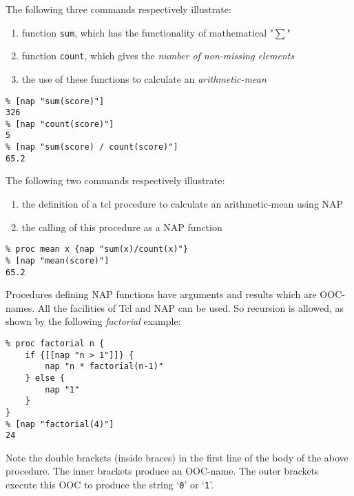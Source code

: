 The following three commands respectively illustrate:
    \begin{enumerate}
      \item function 
      \texttt{sum}, which has the functionality of mathematical
      "$\sum$"
      \item function 
      \texttt{count}, which gives the 
      \emph{number of non-missing elements}
      \item the use of these functions to calculate an 
      \emph{arithmetic-mean}
    \end{enumerate}
    \begin{verbatim}
% [nap "sum(score)"]
326
% [nap "count(score)"]
5
% [nap "sum(score) / count(score)"]
65.2
\end{verbatim}

    

The following two commands respectively illustrate:
    \begin{enumerate}
      \item the definition of a tcl procedure to calculate an
      arithmetic-mean using NAP
      \item the calling of this procedure as a NAP function
    \end{enumerate}
    \begin{verbatim}
% proc mean x {nap "sum(x)/count(x)"}
% [nap "mean(score)"]
65.2
\end{verbatim}

    

Procedures defining NAP functions have arguments and results
    which are OOC-names. All the facilities of Tcl and NAP can be used.
    So recursion is allowed, as shown by the following 
    \emph{factorial} example:
    \begin{verbatim}
% proc factorial n {
    if {[[nap "n > 1"]]} {
        nap "n * factorial(n-1)"
    } else {
        nap "1"
    }
}
% [nap "factorial(4)"]
24
\end{verbatim}

    

Note the double brackets (inside braces) in the first line of
    the body of the above procedure. The inner brackets produce an
    OOC-name. The outer brackets execute this OOC to produce the string
    `\texttt{0}' or `\texttt{1}'.
